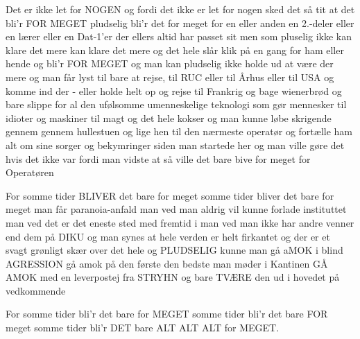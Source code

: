 \documentclass[a4paper,11pt]{article}
\begin{document}
\begin{sketch}
         Det er ikke let for NOGEN
         og fordi det ikke er let for nogen sked det så tit at det bli'r
                FOR MEGET
         pludselig bli'r det for meget for en eller anden
         en 2.-deler eller en lærer eller en Dat-1'er der ellers altid
                har passet sit men som pluselig ikke kan klare det mere
                kan klare det mere og det hele slår klik
         på en gang for ham eller hende og bli'r
                FOR MEGET
         og man kan pludselig ikke holde ud at være der mere
         og man får lyst til bare at rejse, til RUC
                eller til Århus eller til USA
                og komme ind der -
                eller holde helt op og rejse til Frankrig
                og bage wienerbrød
         og bare slippe for al den ufølsomme umenneskelige teknologi
                som gør mennesker til idioter
                og maskiner til magt
         og det hele kokser og man kunne løbe skrigende gennem
                gennem hullestuen og lige hen til den nærmeste operatør
         og fortælle ham alt om sine sorger og bekymringer
                siden man startede her
         og man ville gøre det hvis det ikke var fordi man vidste at så
                ville det bare bive for meget for
                Operatøren

         For somme tider BLIVER det bare for meget
         somme tider bliver det bare for meget
         man får paranoia-anfald
         man ved man aldrig vil kunne forlade instituttet
         man ved det er det eneste sted med fremtid i
         man ved man ikke har andre venner end dem på DIKU
         og man synes at hele verden er helt
                firkantet
         og der er et svagt grønligt skær over det hele
         og PLUDSELIG kunne man gå aMOK i blind AGRESSION gå amok
                på den første den bedste man møder i Kantinen
                GÅ AMOK med en leverpostej fra STRYHN
                og bare TVÆRE den ud i hovedet på vedkommende

         For somme tider bli'r det bare for MEGET
         somme tider bli'r det bare FOR meget
         somme tider bli'r DET bare ALT ALT ALT for MEGET.
\end{sketch}
\end{document}
